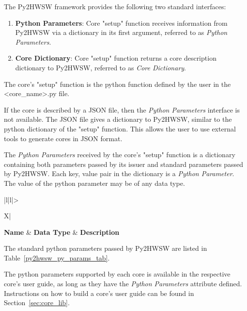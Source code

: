 %

The Py2HWSW framework provides the following two standard interfaces:
\begin{enumerate}
  \item \textbf{Python Parameters}: Core "setup" function receives information from Py2HWSW via a dictionary in its first argument, referred to as \textit{Python Parameters}.
  \item \textbf{Core Dictionary}: Core "setup" function returns a core description dictionary to Py2HWSW, referred to as \textit{Core Dictionary}.
\end{enumerate}

The core's "setup" function is the python function defined by the user in the <core\_name>.py file.

If the core is described by a JSON file, then the \textit{Python Parameters} interface is not available.
The JSON file gives a dictionary to Py2HWSW, similar to the python dictionary of the "setup" function.
This allows the user to use external tools to generate cores in JSON format.

%
%

The \textit{Python Parameters} received by the core's "setup" function is a dictionary containing both parameters passed by its issuer and standard parameters passed by Py2HWSW.
Each key, value pair in the dictionary is a \textit{Python Parameter}.
The value of the python parameter may be of any data type.

{
\setlength{\LTcapwidth}{\linewidth} %
\begin{xltabular}{\textwidth}{|l|l|>{\raggedright\arraybackslash}X|}

  \hline
  {\bf Name} & {\bf Data Type} & {\bf Description}  \\ \hline \hline
  \endfirsthead
  \hline
  \caption{Standard \textit{Python Parameters} passed by Py2HWSW to every core's "setup" function.}
  \endlastfoot

  

  \label{py2hwsw_py_params_tab}
\end{xltabular}
}

The standard python parameters passed by Py2HWSW are listed in Table~\ref{py2hwsw_py_params_tab}.

The python parameters supported by each core is available in the respective core's user guide, as long as they have the \textit{Python Parameters} attribute defined.
Instructions on how to build a core's user guide can be found in Section~\ref{sec:core_lib}. 


